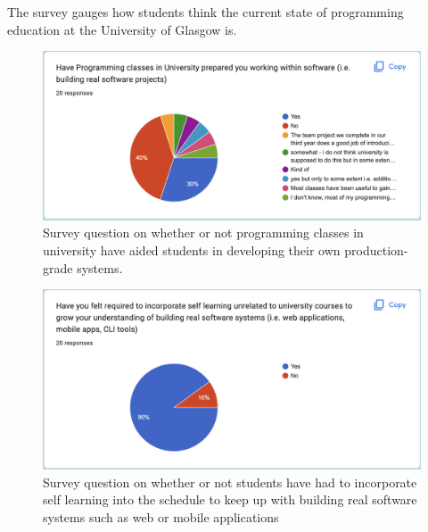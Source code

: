 \documentclass{l4proj}
\begin{document}
\begin{appendices}
\text The survey gauges how students think the current state of programming education at the University of Glasgow is.

\begin{figure}[!ht]
    \centering
    \includegraphics[width=14cm]{dissertation/images/prog-survey-Q1.png}
    \caption{Survey question on whether or not programming classes in university have aided students in developing their own production-grade systems.}
    \label{fig:survey-q1}
\end{figure}

\begin{figure}[!ht]
    \centering
    \includegraphics[width=14cm]{dissertation/images/prog-survey-Q2.png}
    \caption{Survey question on whether or not students have had to incorporate self learning into the schedule to keep up with building real software systems such as web or mobile applications}
    \label{fig:survey-q2}
\end{figure}


\end{appendices}
\end{document}
